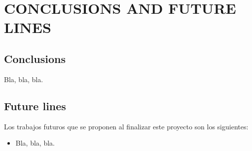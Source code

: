 \newpage
\section{CONCLUSIONS AND FUTURE LINES} \label{conclusions}

\subsection{Conclusions}

Bla, bla, bla.


\newpage
\subsection{Future lines}

Los trabajos futuros que se proponen al finalizar este proyecto son los siguientes:

\begin{itemize}
    \item Bla, bla, bla.
\end{itemize}